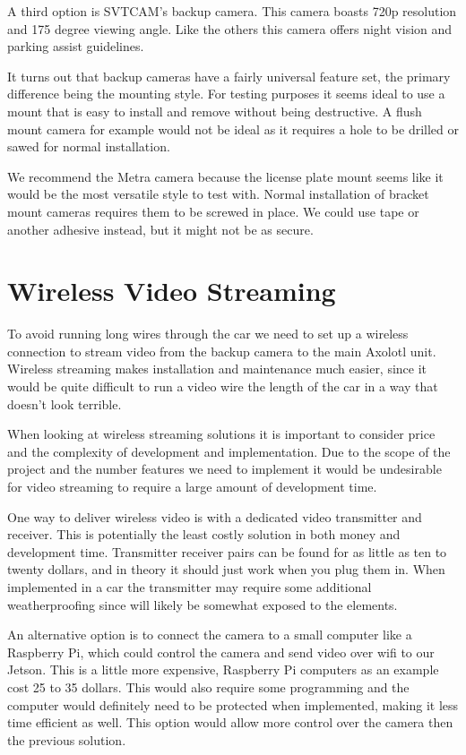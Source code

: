 \documentclass[onecolumn, draftclsnofoot,10pt, compsoc]{IEEEtran}
\begin{document}
A third option is SVTCAM's backup camera. This camera boasts 720p resolution
and 175 degree viewing angle. Like the others this camera offers night vision
and parking assist guidelines.

It turns out that backup cameras have a fairly universal feature set, the primary
difference being the mounting style. For testing purposes it seems ideal to use
a mount that is easy to install and remove without being destructive. A flush
mount camera for example would not be ideal as it requires a hole to be drilled
or sawed for normal installation.

We recommend the Metra camera because the license plate mount seems like
it would be the most versatile style to test with. Normal installation of
bracket mount cameras requires them to be screwed in place. We could use tape or
another adhesive instead, but it might not be as secure.

\section{Wireless Video Streaming}
To avoid running long wires through the car we need to set up a wireless
connection to stream video from the backup camera to the main Axolotl unit.
Wireless streaming makes installation and maintenance much easier, since it
would be quite difficult to run a video wire the length of the car in a way
that doesn't look terrible.

When looking at wireless streaming solutions it is important to consider price
and the complexity of development and implementation. Due to the scope of the
project and the number features we need to implement it would be undesirable
for video streaming to require a large amount of development time.

One way to deliver wireless video is with a dedicated video transmitter and
receiver. This is potentially the least costly solution in both money and
development time. Transmitter receiver pairs can be found for as little as ten
to twenty dollars, and in theory it should just work when you plug them in.
When implemented in a car the transmitter may require some additional
weatherproofing since will likely be somewhat exposed to the elements.

An alternative option is to connect the camera to a small computer like a
Raspberry Pi, which could control the camera and send video over wifi to our
Jetson. This is a little more expensive, Raspberry Pi computers as an example
cost 25 to 35 dollars. This would also require some programming and the computer
would definitely need to be protected when implemented, making it less time
efficient as well. This option would allow more control over the camera then
the previous solution.
\end{document}
